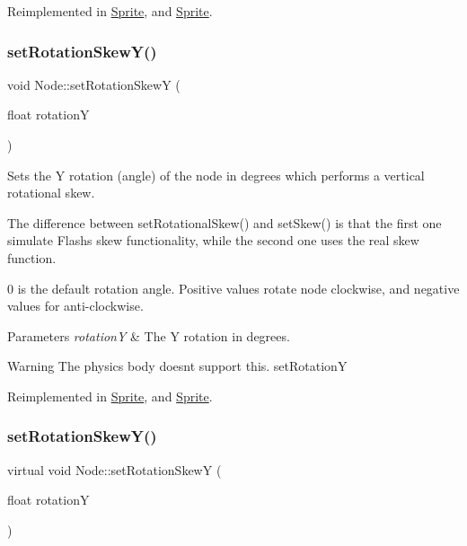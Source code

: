 Reimplemented in \hyperlink{classSprite_adcc286e6eb86f3fd6242de9cdf321301}{Sprite}, and \hyperlink{classSprite_a8fe7bd093a18a2245c230b96f2c59897}{Sprite}.

\mbox{\label{classNode_a901c5fbd2327fbd6fd14771fd45d71af}} 
\subsubsection{\texorpdfstring{set\+Rotation\+Skew\+Y()}{setRotationSkewY()}\hspace{0.1cm}{\footnotesize\ttfamily [1/2]}}
{\footnotesize\ttfamily void Node\+::set\+Rotation\+SkewY (\begin{DoxyParamCaption}\item[{float}]{rotationY }\end{DoxyParamCaption})\hspace{0.3cm}{\ttfamily [virtual]}}

Sets the Y rotation (angle) of the node in degrees which performs a vertical rotational skew.

The difference between {\ttfamily set\+Rotational\+Skew()} and {\ttfamily set\+Skew()} is that the first one simulate Flash\textquotesingle{}s skew functionality, while the second one uses the real skew function.

0 is the default rotation angle. Positive values rotate node clockwise, and negative values for anti-\/clockwise.


\begin{DoxyParams}{Parameters}
{\em rotationY} & The Y rotation in degrees.\\
\hline
\end{DoxyParams}
\begin{DoxyWarning}{Warning}
The physics body doesn\textquotesingle{}t support this.  set\+RotationY 
\end{DoxyWarning}


Reimplemented in \hyperlink{classSprite_a5f3af508d1f9e146ac93c0eaad44dfb1}{Sprite}, and \hyperlink{classSprite_a7ed528b143e0a099f143bc1dbb39cdb1}{Sprite}.

\mbox{\label{classNode_abb8744ead180b08a285e56f59e5e178c}} 
\subsubsection{\texorpdfstring{set\+Rotation\+Skew\+Y()}{setRotationSkewY()}\hspace{0.1cm}{\footnotesize\ttfamily [2/2]}}
{\footnotesize\ttfamily virtual void Node\+::set\+Rotation\+SkewY (\begin{DoxyParamCaption}\item[{float}]{rotationY }\end{DoxyParamCaption})\hspace{0.3cm}{\ttfamily [virtual]}}

